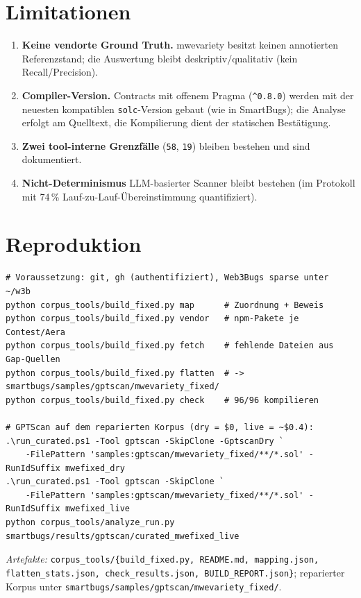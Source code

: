 \documentclass[11pt,a4paper]{scrartcl}
\newcommand{\code}[1]{\texttt{#1}}
\begin{document}
\section{Limitationen}
\begin{enumerate}[leftmargin=1.6em]
  \item \textbf{Keine vendorte Ground Truth.} mwevariety besitzt keinen annotierten
    Referenzstand; die Auswertung bleibt deskriptiv/qualitativ (kein Recall/Precision).
  \item \textbf{Compiler-Version.} Contracts mit offenem Pragma (\code{\textasciicircum0.8.0})
    werden mit der neuesten kompatiblen \code{solc}-Version gebaut (wie in SmartBugs);
    die Analyse erfolgt am Quelltext, die Kompilierung dient der statischen Bestätigung.
  \item \textbf{Zwei tool-interne Grenzfälle} (\code{58}, \code{19}) bleiben bestehen und
    sind dokumentiert.
  \item \textbf{Nicht-Determinismus} LLM-basierter Scanner bleibt bestehen (im Protokoll
    mit 74\,\% Lauf-zu-Lauf-Übereinstimmung quantifiziert).
\end{enumerate}

\section{Reproduktion}
\begin{lstlisting}
# Voraussetzung: git, gh (authentifiziert), Web3Bugs sparse unter ~/w3b
python corpus_tools/build_fixed.py map      # Zuordnung + Beweis
python corpus_tools/build_fixed.py vendor   # npm-Pakete je Contest/Aera
python corpus_tools/build_fixed.py fetch    # fehlende Dateien aus Gap-Quellen
python corpus_tools/build_fixed.py flatten  # -> smartbugs/samples/gptscan/mwevariety_fixed/
python corpus_tools/build_fixed.py check    # 96/96 kompilieren

# GPTScan auf dem reparierten Korpus (dry = $0, live = ~$0.4):
.\run_curated.ps1 -Tool gptscan -SkipClone -GptscanDry `
    -FilePattern 'samples:gptscan/mwevariety_fixed/**/*.sol' -RunIdSuffix mwefixed_dry
.\run_curated.ps1 -Tool gptscan -SkipClone `
    -FilePattern 'samples:gptscan/mwevariety_fixed/**/*.sol' -RunIdSuffix mwefixed_live
python corpus_tools/analyze_run.py smartbugs/results/gptscan/curated_mwefixed_live
\end{lstlisting}

\medskip
\noindent\emph{Artefakte:} \code{corpus\_tools/\{build\_fixed.py, README.md, mapping.json,
flatten\_stats.json, check\_results.json, BUILD\_REPORT.json\}};
reparierter Korpus unter \code{smartbugs/samples/gptscan/mwevariety\_fixed/}.
\end{document}
